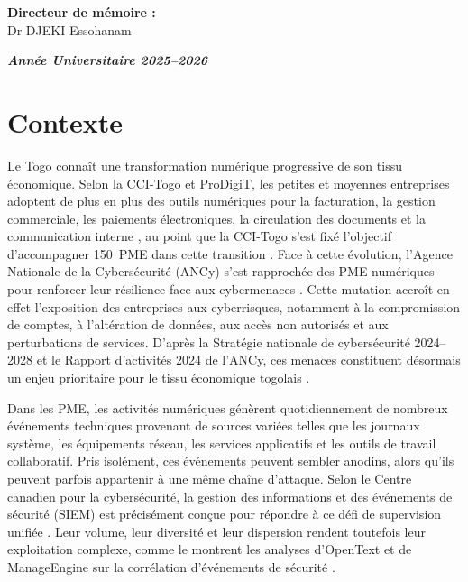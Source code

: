 \documentclass[a4paper,12pt]{article}
\begin{document}
\begin{flushright}
{\large\bfseries Directeur de mémoire :}\\[0.15cm]
Dr  DJEKI Essohanam
\end{flushright}

\vfill

\begin{center}
{\large\bfseries\itshape
Année Universitaire 2025--2026
}
\end{center}

\newpage
\pagestyle{fancy}
\setcounter{page}{1}


\section{Contexte}

Le Togo connaît une transformation numérique progressive de son tissu
économique. Selon la CCI-Togo et ProDigiT,
les petites et moyennes entreprises adoptent de plus en plus des outils
numériques pour la facturation, la gestion commerciale, les paiements
électroniques, la circulation des documents et la communication interne
\cite{togo_first_digitalisation_pme},
au point que la CCI-Togo s'est fixé l'objectif d'accompagner 150~PME dans
cette transition \cite{togo_first_150_pme}. Face à cette évolution, l'Agence
Nationale de la Cybersécurité (ANCy) s'est rapprochée des PME numériques
pour renforcer leur résilience face aux cybermenaces
\cite{ancy_pme_numeriques,ancy_renforce_resilience}.
Cette mutation accroît en effet l'exposition des entreprises aux cyberrisques,
notamment à la compromission de comptes, à l'altération de données, aux
accès non autorisés et aux perturbations de services.
D'après la Stratégie nationale de cybersécurité 2024--2028 et le Rapport
d'activités 2024 de l'ANCy,
ces menaces constituent désormais un enjeu prioritaire pour le tissu
économique togolais \cite{ancy_strategie_2024_2028,ancy_report_2024}.

Dans les PME, les activités numériques génèrent quotidiennement de nombreux
événements techniques provenant de sources variées telles que les journaux
système, les équipements réseau, les services applicatifs et les outils de
travail collaboratif. Pris isolément, ces événements peuvent sembler anodins,
alors qu'ils peuvent parfois appartenir à une même chaîne d'attaque. Selon
le Centre canadien pour la cybersécurité, la gestion
des informations et des événements de sécurité (SIEM) est précisément conçue
pour répondre à ce défi de supervision unifiée \cite{cyber_canada_siem}. Leur volume, leur diversité
et leur dispersion rendent toutefois leur exploitation complexe, comme le
montrent les analyses d'OpenText et de ManageEngine sur la corrélation
d'événements de sécurité \cite{opentext_event_correlation,manageengine_correlation}.
\end{document}

